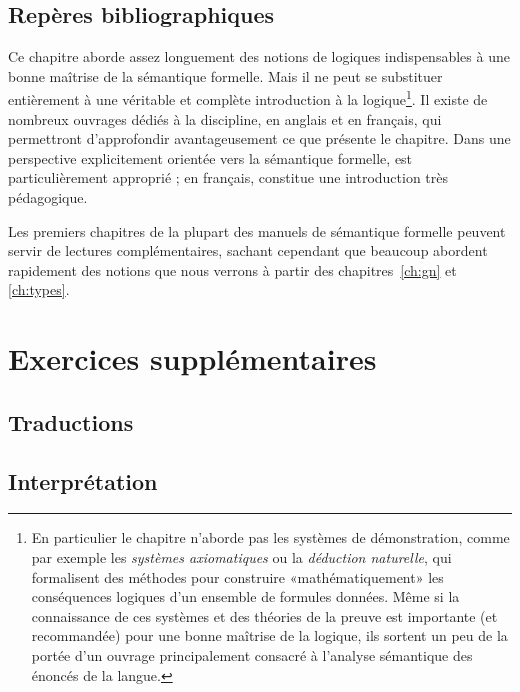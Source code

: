 \largerpage

\nocite{DWP:81,ChierchiaMcCG:90,Corb:13}\nocite{LBdG:03}\nocite{Gamut:1}%

\subsection*{Repères bibliographiques}
Ce chapitre aborde assez longuement des notions de logiques indispensables à une bonne maîtrise de la sémantique formelle. Mais il ne peut se substituer entièrement à une véritable et complète introduction à la logique\footnote{En particulier le chapitre n'aborde pas les systèmes de démonstration, comme par exemple les \emph{systèmes axiomatiques} ou la \emph{déduction naturelle}, qui formalisent des méthodes pour construire «mathématiquement» les conséquences logiques d'un ensemble de formules données. Même si la connaissance de ces systèmes et des théories de la preuve  est importante (et recommandée) pour une bonne maîtrise de la logique, ils sortent un peu de la portée d'un ouvrage principalement consacré à l'analyse sémantique des énoncés de la langue.}. 
Il existe de nombreux ouvrages dédiés à la discipline, en anglais et en français, qui permettront d'approfondir  avantageusement ce que présente le chapitre. Dans une perspective explicitement orientée vers la sémantique formelle, \citet{Gamut:1} est particulièrement approprié ; en français, \citet{LBdG:03} constitue une introduction très pédagogique.

Les premiers chapitres de la plupart des manuels de sémantique formelle \citep[p. ex.][]{DWP:81,ChierchiaMcCG:90,Corb:13} peuvent servir de lectures complémentaires, sachant cependant que beaucoup abordent rapidement des notions que nous verrons à partir des chapitres~\ref{ch:gn} et \ref{ch:types}.




\section*{Exercices supplémentaires}

\subsection*{Traductions}



\medskip




\subsection*{Interprétation}








